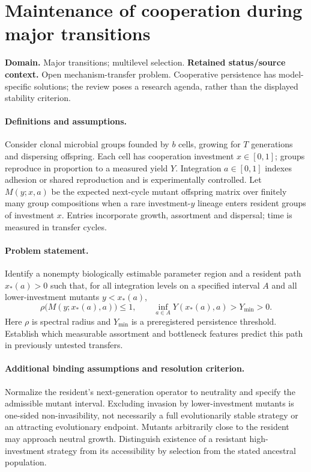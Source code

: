 \documentclass[11pt]{article}
\begin{document}
\section*{Maintenance of cooperation during major transitions}
\label{prob:151}
\label{rank:152}
\par\smallskip

\noindent\textbf{Domain.} Major transitions; multilevel selection. \quad \textbf{Retained status/source context.} Open mechanism-transfer problem. Cooperative persistence has model-specific solutions; the review poses a research agenda, rather than the displayed stability criterion.
\paragraph{Definitions and assumptions.} Consider clonal microbial groups founded by $b$ cells, growing for $T$ generations and dispersing offspring. Each cell has cooperation investment $x\in[0,1]$; groups reproduce in proportion to a measured yield $Y$. Integration $a\in[0,1]$ indexes adhesion or shared reproduction and is experimentally controlled. Let $M(y;x,a)$ be the expected next-cycle mutant offspring matrix over finitely many group compositions when a rare investment-$y$ lineage enters resident groups of investment $x$. Entries incorporate growth, assortment and dispersal; time is measured in transfer cycles.
\paragraph{Problem statement.} Identify a nonempty biologically estimable parameter region and a resident path $x_*(a)>0$ such that, for all integration levels on a specified interval $A$ and all lower-investment mutants $y<x_*(a)$,
\[
 \rho\bigl(M(y;x_*(a),a)\bigr)\le1,
 \qquad \inf_{a\in A}Y(x_*(a),a)>Y_{\min}>0.
\]
Here $\rho$ is spectral radius and $Y_{\min}$ is a preregistered persistence threshold. Establish which measurable assortment and bottleneck features predict this path in previously untested transfers.
\paragraph{Additional binding assumptions and resolution criterion.} Normalize the resident's next-generation operator to neutrality and specify the admissible mutant interval. Excluding invasion by lower-investment mutants is one-sided non-invasibility, not necessarily a full evolutionarily stable strategy or an attracting evolutionary endpoint. Mutants arbitrarily close to the resident may approach neutral growth. Distinguish existence of a resistant high-investment strategy from its accessibility by selection from the stated ancestral population.
\end{document}
